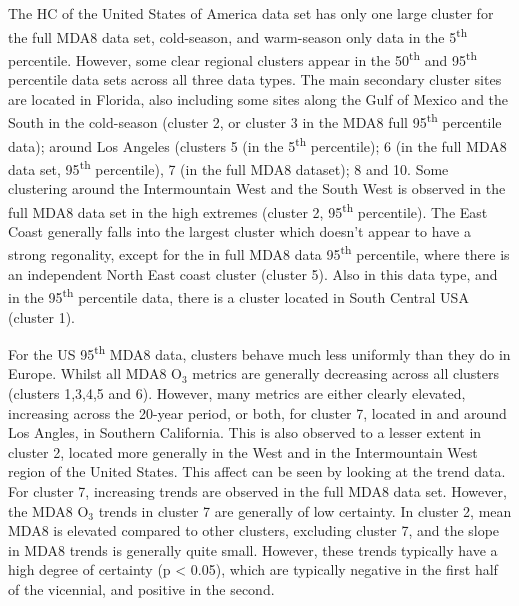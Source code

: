 \documentclass[journal abbreviation, manuscript]{copernicus}
\begin{document}
The HC of the United States of America data set has only one large cluster for the full MDA8 data set, cold-season, and warm-season only data in the 5\textsuperscript{th} percentile. However, some clear regional clusters appear in the 50\textsuperscript{th} and 95\textsuperscript{th} percentile data sets across all three data types. The main secondary cluster sites are located in Florida, also including some sites along the Gulf of Mexico and the South in the cold-season (cluster 2, or cluster 3 in the MDA8 full 95\textsuperscript{th} percentile data); around Los Angeles (clusters 5 (in the 5\textsuperscript{th} percentile); 6 (in the full MDA8 data set, 95\textsuperscript{th} percentile), 7 (in the full MDA8 dataset); 8 and 10. Some clustering around the Intermountain West and the South West is observed in the full MDA8 data set in the high extremes (cluster 2, 95\textsuperscript{th} percentile). The East Coast generally falls into the largest cluster which doesn't appear to have a strong regonality, except for the in full MDA8 data 95\textsuperscript{th} percentile, where there is an independent North East coast cluster (cluster 5). Also in this data type, and in the 95\textsuperscript{th} percentile data, there is a cluster located in South Central USA (cluster 1).

For the US 95\textsuperscript{th} MDA8 data, clusters behave much less uniformly than they do in Europe. Whilst all MDA8 O$_3$ metrics are generally decreasing across all clusters (clusters 1,3,4,5 and 6). However, many metrics are either clearly elevated, increasing across the 20-year period, or both, for cluster 7, located in and around Los Angles, in Southern California. This is also observed to a lesser extent in cluster 2, located more generally in the West and in the Intermountain West region of the United States. This affect can be seen by looking at the trend data. For cluster 7, increasing trends are observed in the full MDA8 data set. However, the MDA8 O$_3$ trends in cluster 7 are generally of low certainty. In cluster 2, mean MDA8 is elevated compared to other clusters, excluding cluster 7, and the slope in MDA8 trends is generally quite small. However, these trends typically have a high degree of certainty (p < 0.05), which are typically negative in the first half of the vicennial, and positive in the second. 



\end{document}

